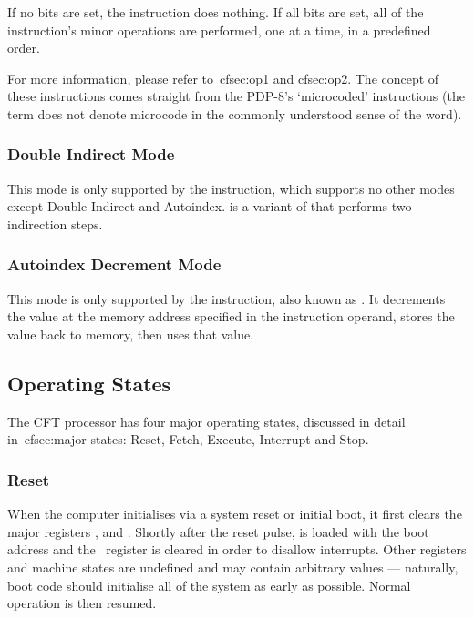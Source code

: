 If no bits are set, the instruction does nothing. If all bits are set, all of
the instruction's minor operations are performed, one at a time, in a
predefined order.

For more information, please refer to~cf{sec:op1} and cf{sec:op2}. The concept
of these instructions comes straight from the PDP-8's ‘microcoded’ instructions
(the term does not denote microcode in the commonly understood sense of the
word).

\subsubsection{Double Indirect Mode}
\label{sec:double-indirect-mode}

This mode is only supported by the  instruction, which supports no
other modes except Double Indirect and Autoindex.  is a variant of
 that performs two indirection steps.



\subsubsection{Autoindex Decrement Mode}
\label{sec:autoindex-decrement-mode}

This mode is only supported by the  instruction, also known as
. It decrements the value at the memory address specified in the
instruction operand, stores the value back to memory, then uses that value.



\subsection{Operating States}

The CFT processor has four major operating states, discussed in detail
in~cf{sec:major-states}: Reset, Fetch, Execute, Interrupt and Stop.

\subsubsection{Reset}

When the computer initialises via a system reset or initial boot, it first
clears the major registers \A, \PC{} and \DR{}. Shortly after the reset pulse,
\PC{} is loaded with the boot address  and the \Ireg\ register is
cleared in order to disallow interrupts.  Other registers and machine states
are undefined and may contain arbitrary values — naturally, boot code should
initialise all of the system as early as possible. Normal operation is then
resumed.

